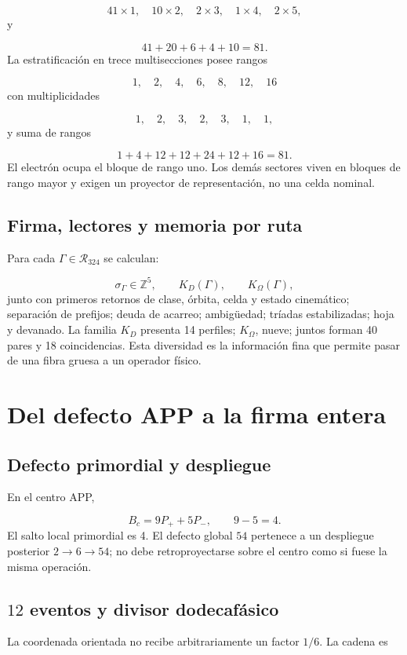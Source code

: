 \[
 41\times1,\quad10\times2,\quad2\times3,\quad1\times4,\quad2\times5,
\]
y

\[
 41+20+6+4+10=81.
\]
La estratificación en trece multisecciones posee rangos

\[
 1,\quad2,\quad4,\quad6,\quad8,\quad12,\quad16
\]
con multiplicidades

\[
 1,\quad2,\quad3,\quad2,\quad3,\quad1,\quad1,
\]
y suma de rangos

\[
 1+4+12+12+24+12+16=81.
\]
El electrón ocupa el bloque de rango uno. Los demás sectores viven en bloques de rango mayor y exigen un proyector de representación, no una celda nominal.

\subsection{Firma, lectores y memoria por ruta}
Para cada \(\Gamma\in\mathcal R_{324}\) se calculan:

\[
 \sigma_\Gamma\in\mathbb Z^5,\qquad
 K_D(\Gamma),\qquad K_\Omega(\Gamma),
\]
junto con primeros retornos de clase, órbita, celda y estado cinemático; separación de prefijos; deuda de acarreo; ambigüedad; tríadas estabilizadas; hoja y devanado. La familia \(K_D\) presenta 14 perfiles; \(K_\Omega\), nueve; juntos forman 40 pares y 18 coincidencias. Esta diversidad es la información fina que permite pasar de una fibra gruesa a un operador físico.

\section{Del defecto APP a la firma entera}
\subsection{Defecto primordial y despliegue}
En el centro APP,

\[
 B_c=9P_++5P_-,\qquad 9-5=4.
\]
El salto local primordial es 4. El defecto global \(54\) pertenece a un despliegue posterior \(2\to6\to54\); no debe retroproyectarse sobre el centro como si fuese la misma operación.

\subsection{\(12\) eventos y divisor dodecafásico}
La coordenada orientada no recibe arbitrariamente un factor \(1/6\). La cadena es


